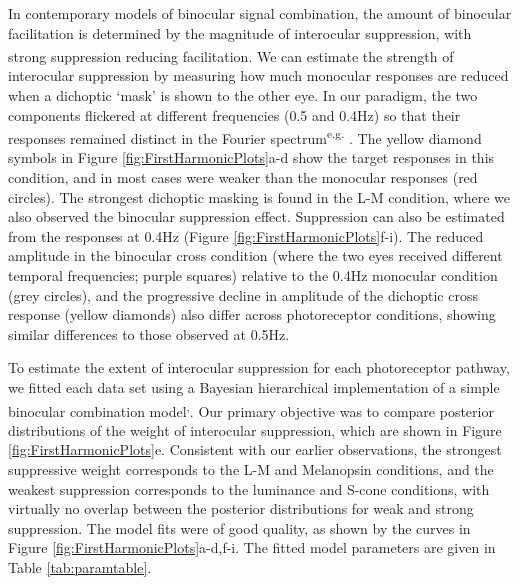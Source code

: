 \documentclass[
]{article}
\begin{document}
In contemporary models of binocular signal combination, the amount of binocular facilitation is determined by the magnitude of interocular suppression, with strong suppression reducing facilitation\textsuperscript{}. We can estimate the strength of interocular suppression by measuring how much monocular responses are reduced when a dichoptic `mask' is shown to the other eye. In our paradigm, the two components flickered at different frequencies (0.5 and 0.4Hz) so that their responses remained distinct in the Fourier spectrum\textsuperscript{e.g. }. The yellow diamond symbols in Figure \ref{fig:FirstHarmonicPlots}a-d show the target responses in this condition, and in most cases were weaker than the monocular responses (red circles). The strongest dichoptic masking is found in the L-M condition, where we also observed the binocular suppression effect. Suppression can also be estimated from the responses at 0.4Hz (Figure \ref{fig:FirstHarmonicPlots}f-i). The reduced amplitude in the binocular cross condition (where the two eyes received different temporal frequencies; purple squares) relative to the 0.4Hz monocular condition (grey circles), and the progressive decline in amplitude of the dichoptic cross response (yellow diamonds) also differ across photoreceptor conditions, showing similar differences to those observed at 0.5Hz.

To estimate the extent of interocular suppression for each photoreceptor pathway, we fitted each data set using a Bayesian hierarchical implementation of a simple binocular combination model\textsuperscript{,}. Our primary objective was to compare posterior distributions of the weight of interocular suppression, which are shown in Figure \ref{fig:FirstHarmonicPlots}e. Consistent with our earlier observations, the strongest suppressive weight corresponds to the L-M and Melanopsin conditions, and the weakest suppression corresponds to the luminance and S-cone conditions, with virtually no overlap between the posterior distributions for weak and strong suppression. The model fits were of good quality, as shown by the curves in Figure \ref{fig:FirstHarmonicPlots}a-d,f-i. The fitted model parameters are given in Table \ref{tab:paramtable}.
\end{document}
